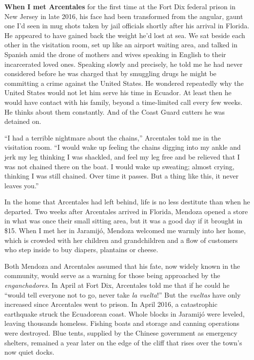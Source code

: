 \textbf{When I met Arcentales} for the first time at the Fort Dix
federal prison in New Jersey in late 2016, his face had been transformed
from the angular, gaunt one I'd seen in mug shots taken by jail
officials shortly after his arrival in Florida. He appeared to have
gained back the weight he'd lost at sea. We sat beside each other in the
visitation room, set up like an airport waiting area, and talked in
Spanish amid the drone of mothers and wives speaking in English to their
incarcerated loved ones. Speaking slowly and precisely, he told me he
had never considered before he was charged that by smuggling drugs he
might be committing a crime against the United States. He wondered
repeatedly why the United States would not let him serve his time in
Ecuador. At least then he would have contact with his family, beyond a
time-limited call every few weeks. He thinks about them constantly. And
of the Coast Guard cutters he was detained on.

``I had a terrible nightmare about the chains,'' Arcentales told me in
the visitation room. ``I would wake up feeling the chains digging into
my ankle and jerk my leg thinking I was shackled, and feel my leg free
and be relieved that I was not chained there on the boat. I would wake
up sweating; almost crying, thinking I was still chained. Over time it
passes. But a thing like this, it never leaves you.''

In the home that Arcentales had left behind, life is no less destitute
than when he departed. Two weeks after Arcentales arrived in Florida,
Mendoza opened a store in what was once their small sitting area, but it
was a good day if it brought in \$15. When I met her in Jaramijó,
Mendoza welcomed me warmly into her home, which is crowded with her
children and grandchildren and a flow of customers who step inside to
buy diapers, plantains or cheese.

Both Mendoza and Arcentales assumed that his fate, now widely known in
the community, would serve as a warning for those being approached by
the \emph{enganchadores}. In April at Fort Dix, Arcentales told me that
if he could he ``would tell everyone not to go, never take \emph{la
vuelta}!'' But the \emph{vueltas} have only increased since Arcentales
went to prison. In April 2016, a catastrophic earthquake struck the
Ecuadorean coast. Whole blocks in Jaramijó were leveled, leaving
thousands homeless. Fishing boats and storage and canning operations
were destroyed. Blue tents, supplied by the Chinese government as
emergency shelters, remained a year later on the edge of the cliff that
rises over the town's now quiet docks.

